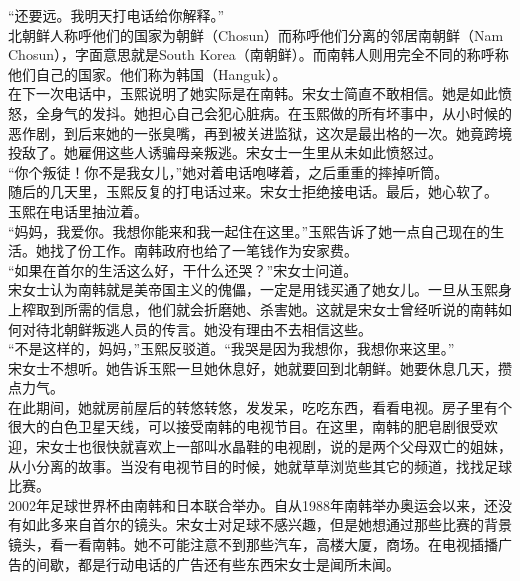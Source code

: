 “还要远。我明天打电话给你解释。”\\

北朝鲜人称呼他们的国家为朝鲜（Chosun）而称呼他们分离的邻居南朝鲜（Nam Chosun），字面意思就是South Korea（南朝鲜）。而南韩人则用完全不同的称呼称他们自己的国家。他们称为韩国（Hanguk）。\\

在下一次电话中，玉熙说明了她实际是在南韩。宋女士简直不敢相信。她是如此愤怒，全身气的发抖。她担心自己会犯心脏病。在玉熙做的所有坏事中，从小时候的恶作剧，到后来她的一张臭嘴，再到被关进监狱，这次是最出格的一次。她竟跨境投敌了。她雇佣这些人诱骗母亲叛逃。宋女士一生里从未如此愤怒过。\\

“你个叛徒！你不是我女儿，”她对着电话咆哮着，之后重重的摔掉听筒。\\

随后的几天里，玉熙反复的打电话过来。宋女士拒绝接电话。最后，她心软了。\\

玉熙在电话里抽泣着。\\

“妈妈，我爱你。我想你能来和我一起住在这里。”玉熙告诉了她一点自己现在的生活。她找了份工作。南韩政府也给了一笔钱作为安家费。\\

“如果在首尔的生活这么好，干什么还哭？”宋女士问道。\\

宋女士认为南韩就是美帝国主义的傀儡，一定是用钱买通了她女儿。一旦从玉熙身上榨取到所需的信息，他们就会折磨她、杀害她。这就是宋女士曾经听说的南韩如何对待北朝鲜叛逃人员的传言。她没有理由不去相信这些。\\

“不是这样的，妈妈，”玉熙反驳道。“我哭是因为我想你，我想你来这里。”\\

宋女士不想听。她告诉玉熙一旦她休息好，她就要回到北朝鲜。她要休息几天，攒点力气。\\

在此期间，她就房前屋后的转悠转悠，发发呆，吃吃东西，看看电视。房子里有个很大的白色卫星天线，可以接受南韩的电视节目。在这里，南韩的肥皂剧很受欢迎，宋女士也很快就喜欢上一部叫水晶鞋的电视剧，说的是两个父母双亡的姐妹，从小分离的故事。当没有电视节目的时候，她就草草浏览些其它的频道，找找足球比赛。\\

2002年足球世界杯由南韩和日本联合举办。自从1988年南韩举办奥运会以来，还没有如此多来自首尔的镜头。宋女士对足球不感兴趣，但是她想通过那些比赛的背景镜头，看一看南韩。她不可能注意不到那些汽车，高楼大厦，商场。在电视插播广告的间歇，都是行动电话的广告还有些东西宋女士是闻所未闻。\\

